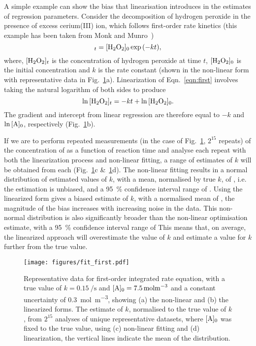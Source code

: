 \documentclass[journal=jceda8,manuscript=article]{achemso}
\begin{document}
A simple example can show the bias that linearisation introduces in the estimates of regression parameters. 
Consider the decomposition of hydrogen peroxide  in the presence of excess cerium(III) ion, which follows first-order rate kinetics (this example has been taken from Monk and Munro~\cite{monk_math_2010})
%
\begin{equation}
    [\ce{H2O2}]_t = [\ce{H2O2}]_0\exp{(-kt)},
    \label{eqn:first}
\end{equation}
%
where, $[\ce{H2O2}]_t$ is the concentration of hydrogen peroxide at time $t$, $[\ce{H2O2}]_0$ is the initial concentration and $k$ is the rate constant (shown in the non-linear form with representative data in Fig.~\ref{fig:fit_first}a).
Linearization of Eqn.~\ref{eqn:first} involves taking the natural logarithm of both sides to produce
%
\begin{equation}
    \ln{[\ce{H2O2}]_t} = -kt + \ln{[\ce{H2O2}]_0}.
\end{equation}
%
The gradient and intercept from linear regression are therefore equal to $-k$ and $\ln{[\ce{A}]_0}$, respectively (Fig.~\ref{fig:fit_first}b).

If we are to perform repeated measurements (in the case of Fig.~\ref{fig:fit_first}, $2^{15}$ repeats) of the concentration of  as a function of reaction time and analyse each repeat with both the linearization process and non-linear fitting, a range of estimates of $k$ will be obtained from each (Fig.~\ref{fig:fit_first}c \&~\ref{fig:fit_first}d).
The non-linear fitting results in a normal distribution of estimated values of $k$, with a mean, normalised by true $k$, of , i.e. the estimation is unbiased, and a \SI{95}{\percent} confidence interval range of .
Using the linearized form gives a biased estimate of $k$, with a normalised mean of , the magnitude of the bias increases with increasing noise in the data.
This non-normal distribution is also significantly broader than the non-linear optimisation estimate, with a \SI{95}{\percent} confidence interval range of 
This means that, on average, the linearized approach will overestimate the value of $k$ and estimate a value for $k$ further from the true value. 
%
\begin{figure}
  \texttt{[image: figures/fit\_first.pdf]}
  \caption{
    Representative data for first-order integrated rate equation, with a true value of $k=\SI{0.15}{\per\second}$ and $[\ce{A}]_0=\SI{7.5}{\mol\m^{-3}}$ and a constant uncertainty of \SI{0.3}{\mol\m^{-3}}, showing (a) the non-linear and (b) the linearized forms. 
    The estimate of $k$, normalised to the true value of $k$, from $2^{15}$ analyses of unique representative datasets, where $[\ce{A}]_0$ was fixed to the true value, using (c) non-linear fitting and (d) linearization, the vertical lines indicate the mean of the distribution. 
    }
  \label{fig:fit_first}
\end{figure}
%
\end{document}
